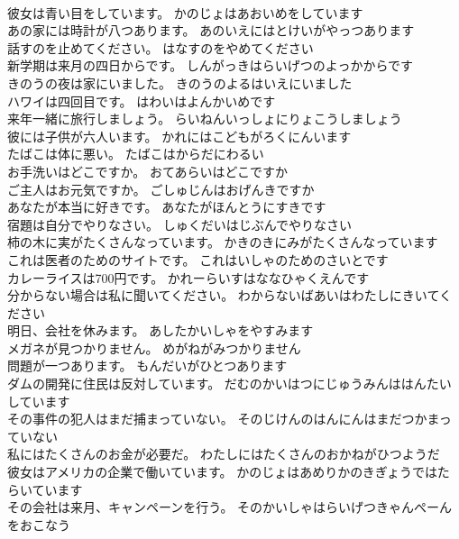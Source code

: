 \documentclass[8pt]{extreport}
\begin{document}
\begin{CJK}{UTF8}{min}
\\	彼女は青い目をしています。	かのじょはあおいめをしています 
\\	あの家には時計が八つあります。	あのいえにはとけいがやっつあります 
\\	話すのを止めてください。	はなすのをやめてください 
\\	新学期は来月の四日からです。	しんがっきはらいげつのよっかからです 
\\	きのうの夜は家にいました。	きのうのよるはいえにいました 
\\	ハワイは四回目です。	はわいはよんかいめです 
\\	来年一緒に旅行しましょう。	らいねんいっしょにりょこうしましょう 
\\	彼には子供が六人います。	かれにはこどもがろくにんいます 
\\	たばこは体に悪い。	たばこはからだにわるい 
\\	お手洗いはどこですか。	おてあらいはどこですか 
\\	ご主人はお元気ですか。	ごしゅじんはおげんきですか 
\\	あなたが本当に好きです。	あなたがほんとうにすきです 
\\	宿題は自分でやりなさい。	しゅくだいはじぶんでやりなさい 
\\	柿の木に実がたくさんなっています。	かきのきにみがたくさんなっています 
\\	これは医者のためのサイトです。	これはいしゃのためのさいとです 
\\	カレーライスは700円です。	かれーらいすはななひゃくえんです 
\\	分からない場合は私に聞いてください。	わからないばあいはわたしにきいてください 
\\	明日、会社を休みます。	あしたかいしゃをやすみます 
\\	メガネが見つかりません。	めがねがみつかりません 
\\	問題が一つあります。	もんだいがひとつあります 
\\	ダムの開発に住民は反対しています。	だむのかいはつにじゅうみんははんたいしています 
\\	その事件の犯人はまだ捕まっていない。	そのじけんのはんにんはまだつかまっていない 
\\	私にはたくさんのお金が必要だ。	わたしにはたくさんのおかねがひつようだ 
\\	彼女はアメリカの企業で働いています。	かのじょはあめりかのきぎょうではたらいています 
\\	その会社は来月、キャンペーンを行う。	そのかいしゃはらいげつきゃんぺーんをおこなう 

\end{CJK}
\end{document}
